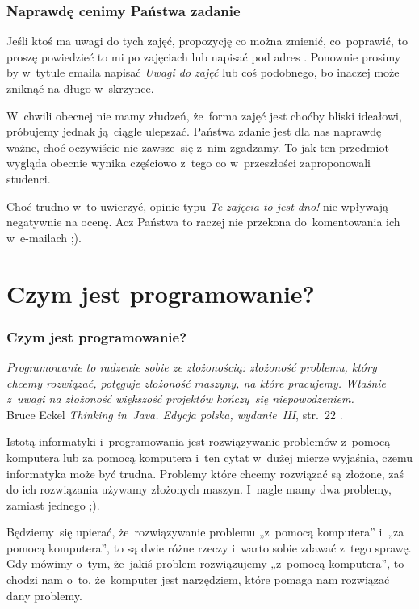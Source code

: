 \documentclass[10pt,t]{beamer}
\begin{document}
\begin{frame}
  \frametitle{Naprawdę cenimy Państwa zadanie}


  Jeśli ktoś ma uwagi do tych zajęć, propozycję co można zmienić,
  co~poprawić, to proszę powiedzieć to mi po zajęciach lub napisać pod
  adres \email. Ponownie prosimy by w~tytule emaila napisać
  \textit{Uwagi do zajęć} lub coś podobnego, bo inaczej może zniknąć na
  długo w~skrzynce.

  W~chwili obecnej nie mamy złudzeń, że~forma zajęć jest choćby bliski
  ideałowi, próbujemy jednak ją~ciągle ulepszać. Państwa zdanie jest dla
  nas naprawdę \alert{ważne}, choć oczywiście nie zawsze~się z~nim zgadzamy.
  To jak ten przedmiot wygląda obecnie wynika częściowo z~tego co
  w~przeszłości zaproponowali studenci.

  Choć trudno w~to uwierzyć, opinie typu \textit{Te zajęcia to jest dno!}
  nie wpływają negatywnie na ocenę. Acz Państwa to raczej nie przekona
  do~komentowania ich w~e-mailach ;).

\end{frame}










\section{Czym jest programowanie?}


\begin{frame}
  \frametitle{Czym jest programowanie?}


  \textit{Programowanie to radzenie sobie ze złożonością: złożoność
    problemu, który chcemy rozwiązać, potęguje złożoność maszyny, na które
    pracujemy. Właśnie z~uwagi na złożoność większość projektów kończy~się
    niepowodzeniem.} \\
  Bruce Eckel \textit{Thinking in~Java. Edycja polska, wydanie~III},
  str.~$22$
  \parencite{Eckel-Thinking-in-Java-Ed-polska-Wyd-III-Pub-2003}.

  Istotą informatyki i~programowania jest rozwiązywanie problemów z~pomocą
  komputera lub za pomocą komputera i~ten cytat w~dużej mierze wyjaśnia,
  czemu informatyka może być trudna. Problemy które chcemy rozwiązać są
  złożone, zaś do ich rozwiązania używamy złożonych maszyn. I~nagle mamy dwa
  problemy, zamiast jednego ;).

  Będziemy~się upierać, że~rozwiązywanie problemu „z~pomocą komputera”
  i~„za pomocą komputera”, to są dwie różne rzeczy i~warto sobie zdawać
  z~tego sprawę. Gdy mówimy o~tym, że~jakiś problem rozwiązujemy „z~pomocą
  komputera”, to chodzi nam o~to, że~komputer jest narzędziem, które
  pomaga nam rozwiązać dany problemy.

\end{frame}
\end{document}
